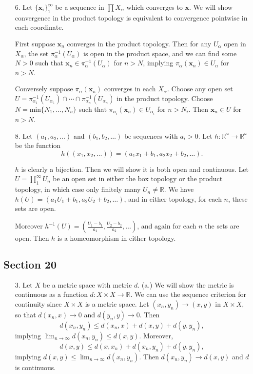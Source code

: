 \documentclass[11pt, reqno]{article}
\theoremstyle{plain}
\theoremstyle{definition}
\theoremstyle{remark}
\newcommand{\RR}{\mathbb{R}}
\begin{document}
\begin{enumerate}
    \item[6.] Let $\{\textbf{x}_i\}_1^\infty$ be a sequence in $\prod X_\alpha$ which converges to $\textbf{x}$.
    We will show convergence in the product topology is equivalent to convergence pointwise in each coordinate.

    First suppose $\textbf{x}_n$ converges in the product topology. Then for any $U_\alpha$ open in $X_\alpha$,
    the set $\pi_\alpha^{-1}(U_\alpha)$ is open in the product space, and we can find some $N > 0$ such that 
    $\textbf{x}_n \in \pi_\alpha^{-1}(U_\alpha)$ for $n > N$, implying $\pi_\alpha(\textbf{x}_n) \in U_\alpha$
    for $n > N$. 

    Conversely suppose $\pi_\alpha(\textbf{x}_n)$ converges in each $X_\alpha$. Choose any open set 
    $U = \pi_{\alpha_1}^{-1}(U_{\alpha_1}) \cap \cdots \cap \pi_{\alpha_n}^{-1}(U_{\alpha_n})$ 
    in the product topology. Choose $N = \text{min}\{N_1,\dots, N_n\}$ such that 
    $\pi_{\alpha_i}(\textbf{x}_n) \in U_{\alpha_i}$ for $n > N_i$. Then $\textbf{x}_n \in U$ for 
    $n > N$.

    \item[8.] Let $(a_1, a_2, \dots)$ and $(b_1, b_2,\dots)$ be sequences with $a_i > 0$.
    Let $h: \RR^\omega \rightarrow \RR^\omega$ be the function 
    \[
        h((x_1, x_2, \dots)) = (a_1 x_1 + b_1, a_2 x_2 + b_2,\dots).
    \]

    $h$ is clearly a bijection. Then we will show it is both open and continuous. 
    Let $U = \prod_1^\infty U_n$ be an open set in either the box topology or the product topology,
    in which case only finitely many $U_n \neq \RR$. We have $h(U) = (a_1 U_1 + b_1, a_2 U_2 + b_2, \dots)$,
    and in either topology, for each $n$, these sets are open.

    Moreover $h^{-1}(U) = (\frac{U_1 - b_1}{a_1}, \frac{U_2 - b_2}{a_2}, \dots)$, and again for each $n$ the sets
    are open. Then $h$ is a homeomorphism in either topology.
\end{enumerate}

\subsection*{Section 20}

\begin{enumerate}
    \item[3.] Let $X$ be a metric space with metric $d$. 
    (a.) We will show the metric is continuous as a function $d: X \times X \rightarrow \RR$. We can use 
    the sequence criterion for continuity since $X\times X$ is a metric space. Let $(x_n, y_n) \rightarrow (x,y)$
    in $X \times X$, so that $d(x_n, x) \rightarrow 0$ and $d(y_n, y) \rightarrow 0$. Then 
    \[
        d(x_n, y_n) \leq d(x_n, x) + d(x,y) + d(y, y_n),
    \]
    implying $\lim_{n \rightarrow \infty} d(x_n, y_n) \leq d(x,y)$. Moreover,
    \[
        d(x,y) \leq d(x, x_n) + d(x_n, y_n) + d(y, y_n),
    \]
    implying $d(x,y) \leq \lim_{n \rightarrow \infty} d(x_n,y_n)$. Then $d(x_n, y_n) \rightarrow d(x,y)$ and $d$ is continuous.
\end{enumerate}
\end{document}
